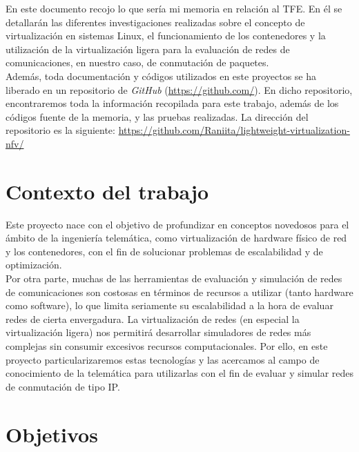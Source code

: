 \documentclass[a4paper, oneside, 12pt]{book}
\begin{document}
	\noindent En este documento recojo lo que sería mi memoria en relación al TFE. En él se detallarán las diferentes investigaciones realizadas sobre el concepto de virtualización en sistemas Linux, el funcionamiento de los contenedores y la utilización de la virtualización ligera para la evaluación de redes de comunicaciones, en nuestro caso, de conmutación de paquetes. \\
	
	\noindent Además, toda documentación y códigos utilizados en este proyectos se ha liberado en un repositorio de \textit{GitHub} (\url{https://github.com/}). En dicho repositorio, encontraremos toda la información recopilada para este trabajo, además de los códigos fuente de la memoria, y las pruebas realizadas. La dirección del repositorio es la siguiente: \url{https://github.com/Raniita/lightweight-virtualization-nfv/}
	
	\section{Contexto del trabajo}
	\noindent Este proyecto nace con el objetivo de profundizar en conceptos novedosos para el ámbito de la ingeniería telemática, como virtualización de hardware físico de red y los contenedores, con el fin de solucionar problemas de escalabilidad y de optimización.\\
	
	 \noindent Por otra parte, muchas de las herramientas de evaluación y simulación de redes de comunicaciones son costosas en términos de recursos a utilizar (tanto hardware como software), lo que limita seriamente su escalabilidad a la hora de evaluar redes de cierta envergadura. La virtualización de redes (en especial la virtualización ligera) nos permitirá desarrollar simuladores de redes más complejas sin consumir excesivos recursos computacionales. Por ello, en este proyecto  particularizaremos estas tecnologías y las acercamos al campo de conocimiento de la telemática para utilizarlas con el fin de evaluar y simular redes de conmutación de tipo IP. \\
	
	\section{Objetivos}
	
\end{document}
